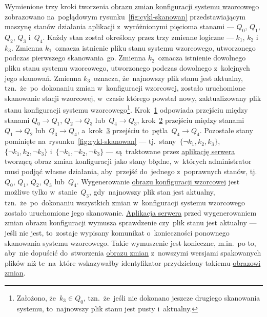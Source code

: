 \documentclass[thesis]{subfiles}
\begin{document}
Wymienione trzy kroki tworzenia \hyperref[sec:obraz-zmian-konfiguracji]{obrazu zmian konfiguracji systemu wzorcowego} zobrazowano na~poglądowym rysunku~\ref{fig:cykl-skanowan} przedstawiającym maszynę stanów działania aplikacji z~wyróżnionymi pięcioma stanami --- $Q_0$, $Q_1$, $Q_2$, $Q_3$ i~$Q_4$. Każdy stan został określony przez trzy zmienne logiczne --- $k_1$, $k_2$ i~$k_3$. Zmienna $k_1$~oznacza istnienie pliku stanu systemu wzorcowego, utworzonego podczas pierwszego skanowania~go. Zmienna $k_2$~oznacza istnienie dowolnego pliku stanu systemu wzorcowego, utworzonego podczas dowolnego z~kolejnych jego skanowań. Zmienna $k_3$~oznacza, że~najnowszy plik stanu jest aktualny, tzn.~że~po~dokonaniu zmian w~konfiguracji wzorcowej, zostało uruchomione skanowanie stacji wzorcowej, w~czasie którego powstał nowy, zaktualizowany plik stanu konfiguracji systemu wzorcowego\footnote{Założono, że~$k_3\in Q_0$, tzn.~że~jeśli nie dokonano jeszcze drugiego skanowania systemu, to~najnowszy plik stanu jest pusty i~aktualny.}. Krok~\hyperlink{itm:pierwsze-skanowanie}{1} odpowiada przejściu między stanami $Q_0\rightarrow Q_1$, $Q_2\rightarrow Q_3$ lub~$Q_4\rightarrow Q_3$, krok~\hyperlink{itm:dokonanie-zmian}{2} przejściu między stanami $Q_1\rightarrow Q_2$ lub~$Q_3\rightarrow Q_4$, a~krok~\hyperlink{itm:dokonanie-zmian}{3} przejściu to~pętla~$Q_4\rightarrow Q_4$. Pozostałe stany pominięte na~rysunku~\ref{fig:cykl-skanowan} --- tj.~stany~$\{\neg k_1,k_2,k_3\}$, $\{\neg k_1,k_2,\neg k_3\}$ i~$\{\neg k_1,\neg k_2,\neg k_3\}$ --- są~traktowane przez \hyperref[sec:srv-app]{aplikację serwera} tworzącą obraz zmian konfiguracji jako stany błędne, w~których administrator musi podjąć własne działania, aby~przejść do~jednego z~poprawnych stanów, tj.~$Q_0$, $Q_1$, $Q_2$, $Q_3$ lub~$Q_4$. Wygenerowanie \hyperref[sec:obraz-zmian-konfiguracji]{obrazu konfiguracji wzorcowej} jest możliwe tylko w~stanie~$Q_3$, gdy~najnowszy plik stan jest aktualny, tzn.~że~po~dokonaniu wszystkich zmian w~konfiguracji systemu wzorcowego zostało uruchomione jego skanowanie. \hyperref[sec:srv-app]{Aplikacja serwera} przed wygenerowaniem zmian obrazu konfiguracji wymusza sprawdzenie czy~plik stanu jest aktualny --- jeśli nie jest, to~zostaje wypisany komunikat o~konieczności ponownego skanowania systemu wzorcowego. Takie wymuszenie jest konieczne, m.in.~po to, aby~nie dopuścić do~stworzenia \hyperref[sec:obraz-zmian-konfiguracji]{obrazu zmian} z~nowszymi wersjami spakowanych plików niż te~na~które wskazywałby identyfikator przydzielony takiemu \hyperref[sec:obraz-zmian-konfiguracji]{obrazowi zmian}.
\end{document}

